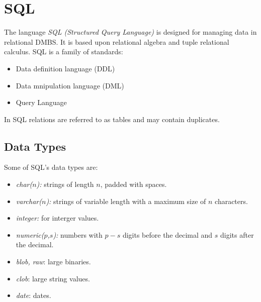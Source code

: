 

\section{SQL}

The language \emph{SQL (Structured Query Language)} is designed for managing data in relational DMBS. It is based upon relational algebra and tuple relational calculus. SQL is a family of standards:

\begin{itemize}
\item Data definition language (DDL)
\item Data mnipulation language (DML)
\item Query Language
\end{itemize}

\begin{note}
In SQL relations are referred to as tables and may contain duplicates.
\end{note}




\subsection{Data Types}

Some of SQL's data types are:
\begin{itemize}
\item \emph{char($n$):} strings of length $n$, padded with spaces.
\item \emph{varchar($n$):} strings of variable length with a maximum size of $n$ characters.
\item \emph{integer:} for interger values.
\item \emph{numeric($p$,$s$):} numbers with $p-s$ digits before the decimal and $s$ digits after the decimal.
\item \emph{blob, raw}: large binaries.
\item \emph{clob}: large string values.
\item \emph{date}: dates.
\end{itemize}


